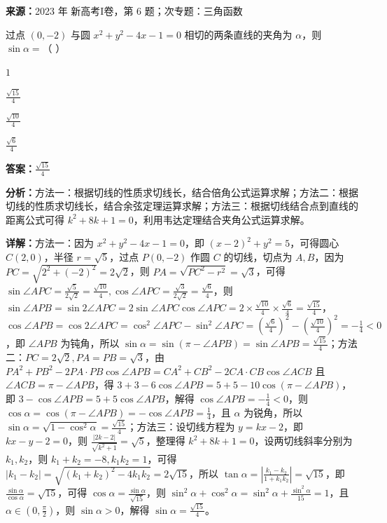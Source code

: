 \begin{question}[points=5]
\textbf{来源：}2023 年 新高考I卷，第 6 题；次专题：三角函数\par
过点 $(0,-2)$ 与圆 $x^2+y^2-4x-1=0$ 相切的两条直线的夹角为 $\alpha$，则 $\sin\alpha=$（ ）
\begin{choices}
  \item $1$
  \item $\frac{\sqrt{15}}{4}$
  \item $\frac{\sqrt{10}}{4}$
  \item $\frac{\sqrt{6}}{4}$
\end{choices}
\begin{solution}
\textbf{答案：}$\frac{\sqrt{15}}{4}$

\textbf{分析：}方法一：根据切线的性质求切线长，结合倍角公式运算求解；方法二：根据切线的性质求切线长，结合余弦定理运算求解；方法三：根据切线结合点到直线的距离公式可得 $k^2+8k+1=0$，利用韦达定理结合夹角公式运算求解。

\textbf{详解：}方法一：因为 $x^2+y^2-4x-1=0$，即 $(x-2)^2+y^2=5$，可得圆心 $C(2,0)$，半径 $r=\sqrt{5}$，过点 $P(0,-2)$ 作圆 $C$ 的切线，切点为 $A,B$，因为 $PC=\sqrt{2^2+(-2)^2}=2\sqrt{2}$，则 $PA=\sqrt{PC^2-r^2}=\sqrt{3}$，可得 $\sin\angle APC=\frac{\sqrt{5}}{2\sqrt{2}}=\frac{\sqrt{10}}{4}, \cos\angle APC=\frac{\sqrt{3}}{2\sqrt{2}}=\frac{\sqrt{6}}{4}$，则 $\sin\angle APB=\sin 2\angle APC=2\sin\angle APC\cos\angle APC=2\times\frac{\sqrt{10}}{4}\times\frac{\sqrt{6}}{4}=\frac{\sqrt{15}}{4}$，$\cos\angle APB=\cos 2\angle APC=\cos^2\angle APC-\sin^2\angle APC=\left(\frac{\sqrt{6}}{4}\right)^2-\left(\frac{\sqrt{10}}{4}\right)^2=-\frac{1}{4}<0$，即 $\angle APB$ 为钝角，所以 $\sin\alpha=\sin(\pi-\angle APB)=\sin\angle APB=\frac{\sqrt{15}}{4}$；方法二：$PC=2\sqrt{2}, PA=PB=\sqrt{3}$，由 $PA^2+PB^2-2PA\cdot PB\cos\angle APB=CA^2+CB^2-2CA\cdot CB\cos\angle ACB$ 且 $\angle ACB=\pi-\angle APB$，得 $3+3-6\cos\angle APB=5+5-10\cos(\pi-\angle APB)$，即 $3-\cos\angle APB=5+5\cos\angle APB$，解得 $\cos\angle APB=-\frac{1}{4}<0$，则 $\cos\alpha=\cos(\pi-\angle APB)=-\cos\angle APB=\frac{1}{4}$，且 $\alpha$ 为锐角，所以 $\sin\alpha=\sqrt{1-\cos^2\alpha}=\frac{\sqrt{15}}{4}$；方法三：设切线方程为 $y=kx-2$，即 $kx-y-2=0$，则 $\frac{|2k-2|}{\sqrt{k^2+1}}=\sqrt{5}$，整理得 $k^2+8k+1=0$，设两切线斜率分别为 $k_1,k_2$，则 $k_1+k_2=-8, k_1k_2=1$，可得 $|k_1-k_2|=\sqrt{(k_1+k_2)^2-4k_1k_2}=2\sqrt{15}$，所以 $\tan\alpha=\left|\frac{k_1-k_2}{1+k_1k_2}\right|=\sqrt{15}$，即 $\frac{\sin\alpha}{\cos\alpha}=\sqrt{15}$，可得 $\cos\alpha=\frac{\sin\alpha}{\sqrt{15}}$，则 $\sin^2\alpha+\cos^2\alpha=\sin^2\alpha+\frac{\sin^2\alpha}{15}=1$，且 $\alpha\in(0,\frac{\pi}{2})$，则 $\sin\alpha>0$，解得 $\sin\alpha=\frac{\sqrt{15}}{4}$。
\end{solution}
\end{question}

